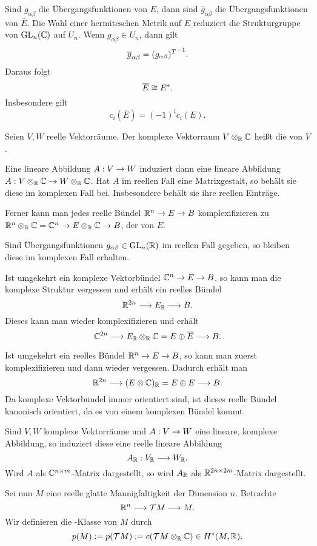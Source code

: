 Sind $g_{\alpha \beta}$ die Übergangsfunktionen von $E$, dann sind $\overline{g}_{\alpha\beta}$ die Übergangsfunktionen von $\overline{E}$. Die Wahl einer hermiteschen Metrik auf $E$ reduziert die Strukturgruppe von $\mathrm{GL}_n(\mathbb{C})$ auf $U_n$. Wenn $g_{\alpha\beta} \in U_n$, dann gilt
\[ \overline{g}_{\alpha\beta} = {(g_{\alpha\beta})^{T}}^{-1}. \]
Daraus folgt
\[ \overline{E} \overset{}{\cong} E^*. \]
Insbesondere gilt
\[ c_i(\overline{E})  = (-1)^i c_i(E). \]

Seien $V,W$ reelle Vektorräume. Der komplexe Vektorraum $V\otimes_{\mathbb{R}} \mathbb{C}$ heißt die  von $V$.

Eine lineare Abbildung $A : V \overset{}{\rightarrow} W$ induziert dann eine lineare Abbildung $A : V\otimes_{\mathbb{R}} \mathbb{C} \overset{}{\rightarrow} W \otimes_{\mathbb{R}} \mathbb{C}$. Hat $A$ im reellen Fall eine Matrixgestalt, so behält sie diese im komplexen Fall bei. Insbesondere behält sie ihre reellen Einträge.

Ferner kann man jedes reelle Bündel $\mathbb{R}^n \overset{}{\rightarrow} E \overset{}{\rightarrow} B$ komplexifizieren zu $\mathbb{R}^n\otimes_{\mathbb{R}} \mathbb{C}  = \mathbb{C}^n \overset{}{\rightarrow} E\otimes_{\mathbb{R}} \mathbb{C} \overset{}{\rightarrow} B$, der  von $E$.

Sind Übergangsfunktionen $g_{\alpha\beta} \in \mathrm{GL}_n(\mathbb{R})$ im reellen Fall gegeben, so bleiben diese im komplexen Fall erhalten.

Ist umgekehrt ein komplexe Vektorbündel $\mathbb{C}^n \overset{}{\rightarrow} E \overset{}{\rightarrow} B$, so kann man die komplexe Struktur vergessen und erhält ein reelles Bündel
\[ \mathbb{R}^{2n} \overset{}{\longrightarrow} E_{\mathbb{R}} \overset{}{\longrightarrow} B. \]
Dieses kann man wieder komplexifizieren und erhält
\[ \mathbb{C}^{2n} \overset{}{\longrightarrow} E_{\mathbb{R}} \otimes_{\mathbb{R}} \mathbb{C} = E \oplus \overline{E} \overset{}{\longrightarrow} B. \]

Ist umgekehrt ein reelles Bündel $\mathbb{R}^n \overset{}{\rightarrow} E \overset{}{\rightarrow} B$, so kann man zuerst komplexifizieren  und dann wieder vergessen. Dadurch erhält man
\[ \mathbb{R}^{2n} \overset{}{\longrightarrow} (E\otimes \mathbb{C})_{\mathbb{R}} = E \oplus E \overset{}{\longrightarrow} B. \]
Da komplexe Vektorbündel immer orientiert sind, ist dieses reelle Bündel kanonisch orientiert, da es von einem komplexen Bündel kommt.


Sind $V,W$ komplexe Vektorräume und $A : V \overset{}{\rightarrow} W$ eine lineare, komplexe Abbildung, so induziert diese eine reelle lineare Abbildung
\[ A_{\mathbb{R}} : V_{\mathbb{R}} \overset{}{\longrightarrow} W_{\mathbb{R}}. \]
Wird $A$ als $\mathbb{C}^{n\times m}$-Matrix dargestellt, so wird $A_{\mathbb{R}}$ als $\mathbb{R}^{2n \times 2m}$-Matrix dargestellt.

Sei nun $M$ eine reelle glatte Mannigfaltigkeit der Dimension $n$. Betrachte
\[ \mathbb{R}^n \overset{}{\longrightarrow} \mathcal{T} M \overset{}{\longrightarrow} M. \]
Wir definieren die -Klasse von $M$ durch
\[ p(M) := p(\mathcal{T} M ) := c(\mathcal{T} M \otimes_{\mathbb{R}} \mathbb{C}) \in H^*(M,\mathbb{R}). \]
